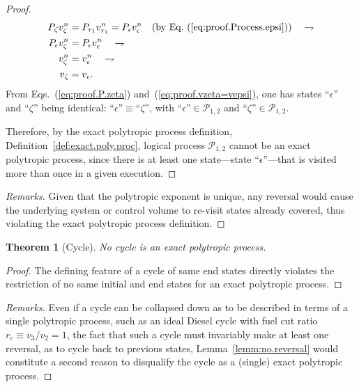 \documentclass[fleqn,11pt]{SelfArx}
\newtheorem{theorem}{Theorem}
\begin{document}
\begin{proof}
\begin{align}
            P_{\zeta}v_{\zeta}^n & = P_{r_1}v_{r_1}^n = P_{\epsilon}v_{\epsilon}^n\quad\mbox{(by
            Eq.~(\ref{eq:proof.Process.epsi}))}\quad\rightharpoondown
            \label{eq:proof.Process.zeta} \\
            P_{\epsilon}v_{\zeta}^n & = P_{\epsilon}v_{\epsilon}^n \quad\rightharpoondown \\
            v_{\zeta}^n & = v_{\epsilon}^n \quad\rightharpoondown \\
            v_{\zeta} & = v_{\epsilon}.
            \label{eq:proof.vzeta=vepsi}
        \end{align}
        From  Eqs.~(\ref{eq:proof.P.zeta})  and~(\ref{eq:proof.vzeta=vepsi}),  one  has   states
        ``$\epsilon$''  and  ``$\zeta$''  being  identical:  $\mbox{``}\epsilon\mbox{''}  \equiv
        \mbox{``}\zeta\mbox{''}$, with $\mbox{``}\epsilon\mbox{''}  \in  \mathcal{P}_{1,2}$  and
        $\mbox{``}\zeta\mbox{''} \in \mathcal{P}_{1,2}$.

        Therefore,      by      the       exact       polytropic       process       definition,
        Definition~\ref{def:exact.poly.proc}, logical process $\mathcal{P}_{1,2}$ cannot  be  an
        exact   polytropic   process,   since   there   is   at    least    one    state---state
        ``$\epsilon$''---that is visited more than once in a given execution.
    \end{proof}

    \begin{proof}[Remarks]
        Given that the polytropic exponent is unique, any reversal would  cause  the  underlying
        system or control volume to re-visit states already covered, thus  violating  the  exact
        polytropic process definition.
    \end{proof}

    \begin{theorem}[Cycle]\label{theo:cycle}
        No cycle is an exact polytropic process.
    \end{theorem}

    \begin{proof}
        The defining feature of a cycle of same end states directly violates the restriction  of
        no same initial and end states for an exact polytropic process.
    \end{proof}

    \begin{proof}[Remarks]
        Even if a cycle can be collapsed down as to be described in terms of a single polytropic
        process, such as an ideal Diesel cycle with fuel cut ratio $r_c \equiv v_3 / v_2  =  1$,
        the fact that such a cycle must invariably make at least one reversal, as to cycle  back
        to previous states, Lemma~\ref{lemm:no.reversal} would constitute  a  second  reason  to
        disqualify the cycle as a (single) exact polytropic process.
    \end{proof}
\end{document}
